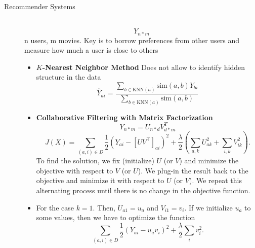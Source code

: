 \documentclass[a4paper, 10pt,landscape]{article}
\begin{document}
\begin{multicols*}{3}
\begin{description}
	\item[Recommender Systems]~
		$$Y_{n*m}$$ n users, m movies. Key is to borrow preferences from other users and measure how much a user is close to others
		\begin{itemize}
			\item[] {\bf $K$-Nearest Neighbor Method} Does not allow to identify hidden structure in the data
				$$\widehat{Y}_{ai}=\dfrac{\sum\limits_{b\in\text{KNN}(a)}\text{sim}(a,b)Y_{bi}}{\sum\limits_{b\in\text{KNN}(a)}\text{sim}(a,b)}$$
			\item[] {\bf Collaborative Filtering with Matrix Factorization}
				$$Y_{n*m} = U_{n*d} V_{d*m}^T$$
				$$J(X)=\sum_{(a,i)\in D}\frac{1}{2}\left(Y_{ai}-\left[UV^\intercal\right]_{ai}\right)^2+\frac{\lambda}{2}\left(\sum_{a,k}U_{ak}^2+\sum_{i,k}V_{ik}^2\right).$$
				To find the solution, we fix (initialize) $U$ (or $V$) and minimize the objective with respect to $V$ (or $U$). We plug-in the result back to the objective and minimize it with respect to $U$ (or $V$). We repeat this alternating process until there is no change in the objective function.
				\item For the case $k=1$. Then, $U_{a1}=u_a$ and $V_{i1}=v_i$. If we initialize $u_a$ to some values, then we have to optimize the function
				$$\sum_{(a,i)\in D}\frac{1}{2}\left(Y_{ai}-u_av_i\right)^2+\frac{\lambda}{2}\sum_{i}v_{i}^2.$$
		\end{itemize}
\end{description}


\end{multicols*}
\end{document}
